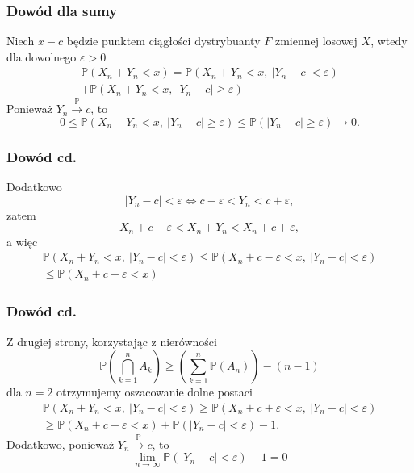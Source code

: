 \documentclass{beamer}
\begin{document}
	\begin{frame}
		\frametitle{Dowód dla sumy}
		Niech $x-c$ będzie punktem ciągłości dystrybuanty $F$ zmiennej losowej $X$, wtedy dla dowolnego $\varepsilon>0$\pause
		\begin{equation}
			\begin{split}
				\mathbb{P}\left(X_n+Y_n<x\right)=\mathbb{P}\left(X_n+Y_n<x,\ |Y_n-c|<\varepsilon\right)\\
				+\mathbb{P}\left(X_n+Y_n<x,\ |Y_n-c|\geq\varepsilon\right)
			\end{split}
		\end{equation}\pause
		Ponieważ $Y_n \xrightarrow{\mathbb{P}}c$, to
		\begin{equation}
			0\leq\mathbb{P}\left(X_n+Y_n<x,\ |Y_n-c|\geq\varepsilon\right)\leq\mathbb{P}\left(|Y_n-c|\geq\varepsilon\right)\to0.
		\end{equation}
	\end{frame}

	\begin{frame}
		\frametitle{Dowód cd.}
		Dodatkowo
		\begin{equation}
			|Y_n-c|<\varepsilon \iff c-\varepsilon < Y_n < c+\varepsilon,
		\end{equation}\pause
		zatem
		\begin{equation}
			X_n+c-\varepsilon < X_n + Y_n < X_n +c + \varepsilon,
		\end{equation}\pause
		a więc
		\begin{equation}
			\begin{split}
				\mathbb{P}\left(X_n+Y_n<x,\ |Y_n-c|<\varepsilon\right)\leq\mathbb{P}\left(X_n+c-\varepsilon<x,\ |Y_n-c|<\varepsilon\right)\\
				\leq \mathbb{P}\left(X_n+c-\varepsilon<x\right)
			\end{split}
		\end{equation}
	\end{frame}

	\begin{frame}
		\frametitle{Dowód cd.}
		Z drugiej strony, korzystając z nierówności
		\begin{equation}
			\mathbb{P}\left(\bigcap_{k=1}^{n} A_k\right)\geq\left(\sum\limits_{k=1}^n \mathbb{P}\left(A_n\right)\right) - (n-1)
		\end{equation}
		dla $n=2$ \pause otrzymujemy oszacowanie dolne postaci
		\begin{equation}
			\begin{split}
				\mathbb{P}\left(X_n+Y_n<x,\ |Y_n-c|<\varepsilon\right)\geq\mathbb{P}\left(X_n+c+\varepsilon<x,\ |Y_n-c|<\varepsilon\right)\\\geq
				\mathbb{P}\left(X_n+c+\varepsilon<x\right)+	\mathbb{P}\left(|Y_n-c|<\varepsilon\right)-1.
			\end{split}
		\end{equation}\pause
		Dodatkowo, ponieważ  $Y_n\xrightarrow{\mathbb{P}}c$, to
		\begin{equation}
			\lim\limits_{n\to\infty}\mathbb{P}\left(|Y_n-c|<\varepsilon\right)-1=0
		\end{equation}
	\end{frame}
\end{document}

